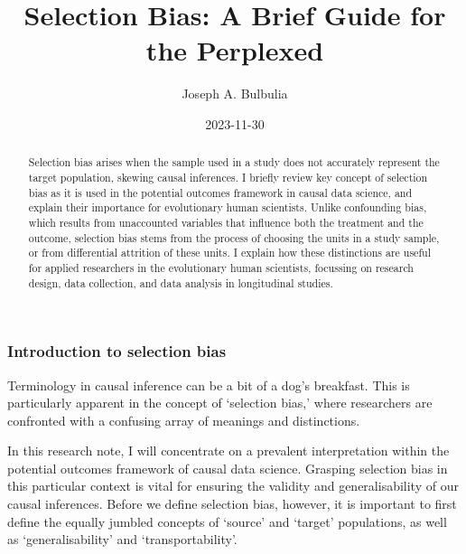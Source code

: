 \documentclass[
  singlecolumn,
  9pt]{article}
\title{Selection Bias: A Brief Guide for the Perplexed}
\author{Joseph A. Bulbulia}
\affil{%
                  Victoria University of Wellington, New Zealand
              }
\date{2023-11-30}
\begin{document}
\maketitle
\begin{abstract}
Selection bias arises when the sample used in a study does not
accurately represent the target population, skewing causal inferences. I
briefly review key concept of selection bias as it is used in the
potential outcomes framework in causal data science, and explain their
importance for evolutionary human scientists. Unlike confounding bias,
which results from unaccounted variables that influence both the
treatment and the outcome, selection bias stems from the process of
choosing the units in a study sample, or from differential attrition of
these units. I explain how these distinctions are useful for applied
researchers in the evolutionary human scientists, focussing on research
design, data collection, and data analysis in longitudinal studies.
\end{abstract}
\subsubsection{Introduction to selection
bias}\label{introduction-to-selection-bias}

Terminology in causal inference can be a bit of a dog's breakfast. This
is particularly apparent in the concept of `selection bias,' where
researchers are confronted with a confusing array of meanings and
distinctions.

In this research note, I will concentrate on a prevalent interpretation
within the potential outcomes framework of causal data science. Grasping
selection bias in this particular context is vital for ensuring the
validity and generalisability of our causal inferences. Before we define
selection bias, however, it is important to first define the equally
jumbled concepts of `source' and `target' populations, as well as
`generalisability' and `transportability'.
\end{document}
